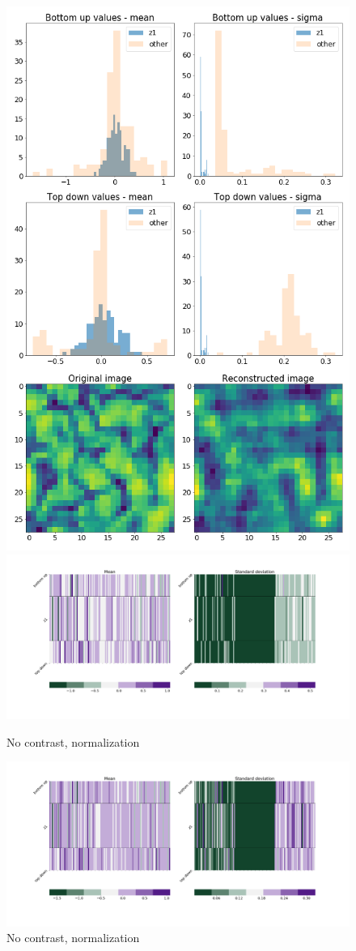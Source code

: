\documentclass[12pt, english]{article}
\begin{document}
\begin{figure}[H]
\begin{minipage}{0.5\linewidth}
    \includegraphics[width=.6\linewidth]{z1_vis/z1_vis_no_contrast_norm/17_DenseLinLinLadderVAE_contrastNorm-stats-2_TD_BU_COMPS_1.png} 
  \end{minipage}

  \begin{minipage}{0.5\linewidth}
    \centering
    \includegraphics[width=.75\linewidth]{z1_vis/z1_vis_no_contrast_norm/17_DenseLinLinLadderVAE_contrastNorm-stats-1_vector_comparisons_1.png} 
    \caption{No contrast, normalization}
    \label{fig:sample-norm-no-contrast-1}
  \end{minipage}
  \begin{minipage}{0.5\linewidth}
    \centering
    \includegraphics[width=.75\linewidth]{z1_vis/z1_vis_no_contrast_norm/17_DenseLinLinLadderVAE_contrastNorm-stats-2_vector_comparisons_1.png}
    \caption{No contrast, normalization}
    \label{fig:sample-norm-no-contrast-2}
  \end{minipage}
\end{figure}
\end{document}

